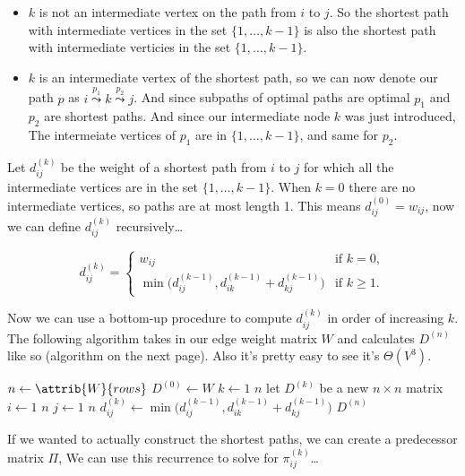 \documentclass[11pt]{article}
\theoremstyle{definition}
\begin{document}
\begin{itemize}
  \item \(k\) is not an intermediate vertex on the path from \(i\) to \(j\).  So the shortest 
    path with intermediate vertices in the set \(\{1,\dots,k-1\}\) is also the shortest path with 
    intermediate verticies in the set \(\{1,\dots,k-1\}\).

  \item \(k\) is an intermediate vertex of the shortest path, so we can now denote our path \(p\)
    as \(i \overset{p_1}\leadsto k \overset{p_2}\leadsto j\).  And since subpaths of optimal 
    paths are optimal \(p_1\) and \(p_2\) are shortest paths. And since our intermediate node 
    \(k\) was just introduced, The intermeiate vertices of \(p_1\) are in \(\{1,\dots,k-1\}\), 
    and same for \(p_2\).
\end{itemize}

Let \(d^{(k)}_{ij}\) be the weight of a shortest path from \(i\) to \(j\) for which all the 
intermediate vertices are in the set \(\{1,\dots,k-1\}\).  When \(k=0\) there are no intermediate 
vertices, so paths are at most length 1.  This means \(d^{(0)}_{ij} = w_{ij}\), now we can define 
\(d^{(k)}_{ij}\) recursively\dots 

\[d^{(k)}_{ij} = \begin{cases}
  w_{ij} & \text{if } k = 0, \\ 
  \min \Big(d^{(k-1)}_{ij}, d^{(k-1)}_{ik} + d^{(k-1)}_{kj}\Big) & \text{if } k \geq 1.
\end{cases}\]

Now we can use a bottom-up procedure to compute \(d^{(k)}_{ij}\) in order of increasing \(k\). 
The following algorithm takes in our edge weight matrix \(W\) and calculates \(D^{(n)}\) 
like so (algorithm on the next page).  Also it's pretty easy to see it's \(\Theta(V^3)\).
\newpage

\begin{codebox}
  \li \(n \gets \attrib{W}{rows}\)
  \li \(D^{(0)} \gets W\)
  \li \For \(k \gets 1\) \To \(n\) \Do
    \li let \(D^{(k)}\) be a new \(n \times n\) matrix
    \li \For \(i \gets 1\) \To \(n\) \Do
      \li \For \(j \gets 1\) \To \(n\) \Do
        \li \(d^{(k)}_{ij} \gets \min \Big(d^{(k-1)}_{ij}, d^{(k-1)}_{ik} + d^{(k-1)}_{kj}\Big)\)
        \End \End \End
  \li \Return \(D^{(n)}\)
\end{codebox}

If we wanted to actually construct the shortest paths, we can create a predecessor matrix \(\Pi\), 
We can use this recurrence to solve for \(\pi^{(k)}_{ij}\)\dots
\end{document}
